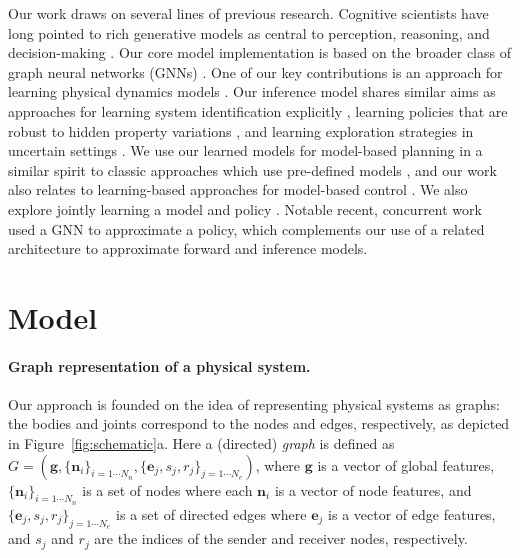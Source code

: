 \documentclass{article}
\begin{document}
Our work draws on several lines of previous research.
%
Cognitive scientists have long pointed to rich generative models as central to perception, reasoning, and decision-making \cite{craik1967nature,johnson1980mental,miall1996forward,spelke2007core,battaglia2013simulation}.
%
Our core model implementation is based on the broader class of graph neural networks (GNNs) \cite{scarselli2005graph,scarselli2009computational,scarselli2009graph,bruna2013spectral,li2015gated,henaff2015deep,duvenaud2015convolutional,dai2016discriminative,defferrard2016convolutional,niepert2016learning,kipf2016semi,battaglia2016interaction,watters2017visual,raposo2017discovering,santoro2017simple,bronstein2017geometric,gilmer2017neural}.
%
One of our key contributions is an approach for learning physical dynamics models \cite{grzeszczuk1998neuroanimator,fragkiadaki2015learning,battaglia2016interaction,chang2016compositional,watters2017visual,ehrhardt2017learning,amos2018learning}.
%
Our inference model shares similar aims as approaches for learning system identification explicitly \cite{yu2017preparing,peng2017sim2real}, learning policies that are robust to hidden property variations \cite{rajeswaran2016eopt}, and learning exploration strategies in uncertain settings \cite{schmidhuber1991curious,sun2011planning,houthooft2016curiosity}.
%
We use our learned models for model-based planning in a similar spirit to classic approaches which use pre-defined models \cite{li2004iterative,tassa2008receding,tassa2014control}, and our work also relates to learning-based approaches for model-based control \cite{atkeson1997comparison,deisenroth2011pilco,levine2014learning}.
%
We also explore jointly learning a model and policy \cite{heess2015learning,gu2016continuous,nagabandi2017neural}.
%
Notable recent, concurrent work \cite{wang2018nervenet} used a GNN to approximate a policy, which complements our use of a related architecture to approximate forward and inference models.


\section{Model}
\label{sec:model}

\paragraph{Graph representation of a physical system.}
Our approach is founded on the idea of representing physical systems as graphs: the bodies and joints correspond to the nodes and edges, respectively, as depicted in Figure~\ref{fig:schematic}a. 
%
Here a (directed) \emph{graph} is defined as ${G=\left(\mathbf{g}, \{\mathbf{n}_i\}_{i=1\cdots N_n},\{\mathbf{e}_j,s_j,r_j\}_{j=1\cdots N_e}\right)}$, where $\textbf{g}$ is a vector of global features, $\{\mathbf{n}_i\}_{i=1\cdots N_n}$ is a set of nodes where each $\mathbf{n}_i$ is a vector of node features, and $\{\mathbf{e}_j, s_j, r_j\}_{j=1\cdots N_e}$ is a set of directed edges where $\mathbf{e}_j$ is a vector of edge features, and $s_j$ and $r_j$ are the indices of the sender and receiver nodes, respectively.
\end{document}
